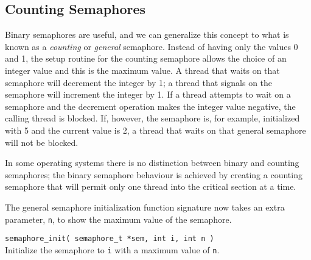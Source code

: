 \subsection*{Counting Semaphores}
Binary semaphores are useful, and we can generalize this concept to what is known as a \textit{counting} or \textit{general} semaphore. Instead of having only the values 0 and 1, the setup routine for the counting semaphore allows the choice of an integer value and this is the maximum value. A thread that waits on that semaphore will decrement the integer by 1; a thread that signals on the semaphore will increment the integer by 1. If a thread attempts to wait on a semaphore and the decrement operation makes the integer value negative, the calling thread is blocked. If, however, the semaphore is, for example, initialized with 5 and the current value is 2, a thread that waits on that general semaphore will not be blocked.

In some operating systems there is no distinction between binary and counting semaphores; the binary semaphore behaviour is achieved by creating a counting semaphore that will permit only one thread into the critical section at a time. 

The general semaphore initialization function signature now takes an extra parameter, \texttt{n}, to show the maximum value of the semaphore.

\texttt{semaphore\_init( semaphore\_t *sem, int i, int n )}\\
Initialize the semaphore to \texttt{i} with a maximum value of \texttt{n}.





